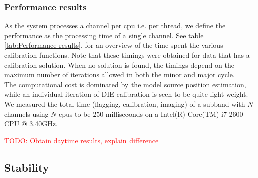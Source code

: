 \documentclass{aa}
\begin{document}
\subsubsection{Performance results}
As the system processes a channel per cpu i.e. per thread, we define the
performance as the processing time of a single channel. See table
\ref{tab:Performance-results}, for an overview of the time spent the various
calibration functions. Note that these timings were obtained for data that has
a calibration solution. When no solution is found, the timings depend on the
maximum number of iterations allowed in both the minor and major cycle. \\
The computational cost is dominated by the model source position estimation,
while an individual iteration of DIE calibration is seen to be quite
light-weight. We measured the total time (flagging, calibration, imaging) of a
subband with $N$ channels using $N$ cpus to be $250$ milliseconds on a Intel(R)
Core(TM) i7-2600 CPU @ 3.40GHz.
\begin{table}[tbh]

\caption{\label{tab:Performance-results} Overview of the time spent in
calibration function blocks for various datasets (daytime and nighttime). We
measured the overall time (flagging, calibrating, imaging) of an ACM to
be 250 ms ($\sigma = 15$) using current generation hardware.}
\end{table}
\textcolor{red}{TODO: Obtain daytime results, explain difference}





\subsection{\label{sub:Stability}Stability}
\end{document}

